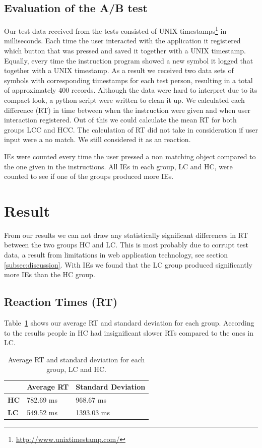 \documentclass[runningheads,a4paper]{llncs}
\begin{document}
\subsection{Evaluation of the A/B test}
Our test data received from the tests consisted of UNIX timestamps\footnote{\url{http://www.unixtimestamp.com/}} in milliseconds. Each time the user interacted with the application it registered which button that was pressed and saved it together with a UNIX timestamp. Equally, every time the instruction program showed a new symbol it logged that together with a UNIX timestamp. As a result we received two data sets of symbols with corresponding timestamps for each test person, resulting in a total of approximately 400 records. Although the data were hard to interpret due to its compact look, a python script were written to clean it up. We calculated each difference (RT) in time between when the instruction were given and when user interaction registered. Out of this we could calculate the mean RT for both groups LCC and HCC. The calculation of RT did not take in consideration if user input were a no match. We still considered it as an reaction.

IEs were counted every time the user pressed a non matching object compared to the one given in the instructions. All IEs in each group, LC and HC, were counted to see if one of the groups produced more IEs.

\section{Result}
From our results we can not draw any statistically significant differences in RT between the two groups HC and LC. This is most probably due to corrupt test data, a result from limitations in web application technology, see section \ref{subsec:discussion}. With IEs we found that the LC group produced significantly more IEs than the HC group.

\subsection{Reaction Times (RT)}
Table~\ref{tab:groupRT} shows our average RT and standard deviation for each group. According to the results people in HC had insignificant slower RTs compared to the ones in LC.

\begin{table}[]
	\centering
	\label{tab:groupRT}
	\setlength{\tabcolsep}{1em}
	\setlength\extrarowheight{1em}
	\begin{tabular}{l|l|l}
		\textbf{} & \textbf{Average RT} & \textbf{Standard Deviation} \\ \hline
		\textbf{HC} & 782.69 ms & 968.67 ms \\ \hline
		\textbf{LC} & 549.52 ms & 1393.03 ms
	\end{tabular}
	\caption{Average RT and standard deviation for each group, LC and HC.}
\end{table}
\end{document}
